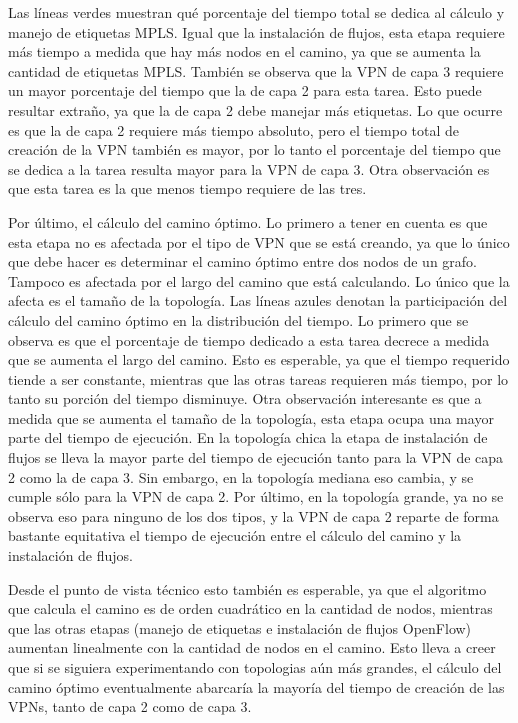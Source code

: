 Las líneas verdes muestran qué porcentaje del tiempo total se dedica al cálculo y manejo de etiquetas MPLS. Igual que la instalación de flujos, esta etapa requiere más tiempo a medida que hay más nodos en el camino, ya que se aumenta la cantidad de etiquetas MPLS. También se observa que la VPN de capa 3 requiere un mayor porcentaje del tiempo que la de capa 2 para esta tarea. Esto puede resultar extraño, ya que la de capa 2 debe manejar más etiquetas. Lo que ocurre es que la de capa 2 requiere más tiempo absoluto, pero el tiempo total de creación de la VPN también es mayor, por lo tanto el porcentaje del tiempo que se dedica a la tarea resulta mayor para la VPN de capa 3. Otra observación es que esta tarea es la que menos tiempo requiere de las tres.

Por último, el cálculo del camino óptimo. Lo primero a tener en cuenta es que esta etapa no es afectada por el tipo de VPN que se está creando, ya que lo único que debe hacer es determinar el camino óptimo entre dos nodos de un grafo. Tampoco es afectada por el largo del camino que está calculando. Lo único que la afecta es el tamaño de la topología.
Las líneas azules denotan la participación del cálculo del camino óptimo en la distribución del tiempo. Lo primero que se observa es que el porcentaje de tiempo dedicado a esta tarea decrece a medida que se aumenta el largo del camino. Esto es esperable, ya que el tiempo requerido tiende a ser constante, mientras que las otras tareas requieren más tiempo, por lo tanto su porción del tiempo disminuye. Otra observación interesante es que a medida que se aumenta el tamaño de la topología, esta etapa ocupa una mayor parte del tiempo de ejecución. En la topología chica la etapa de instalación de flujos se lleva la mayor parte del tiempo de ejecución tanto para la VPN de capa 2 como la de capa 3. Sin embargo, en la topología mediana eso cambia, y se cumple sólo para la VPN de capa 2. Por último, en la topología grande, ya no se observa eso para ninguno de los dos tipos, y la VPN de capa 2 reparte de forma bastante equitativa el tiempo de ejecución entre el cálculo del camino y la instalación de flujos.

Desde el punto de vista técnico esto también es esperable, ya que el algoritmo que calcula el camino es de orden cuadrático en la cantidad de nodos, mientras que las otras etapas (manejo de etiquetas e instalación de flujos OpenFlow) aumentan linealmente con la cantidad de nodos en el camino. Esto lleva a creer que si se siguiera experimentando con topologias aún más grandes, el cálculo del camino óptimo eventualmente abarcaría la mayoría del tiempo de creación de las VPNs, tanto de capa 2 como de capa 3.


